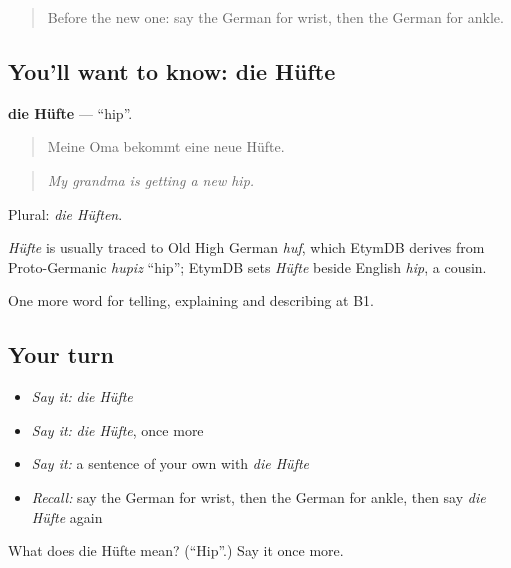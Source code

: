 \label{lesson:GE-C485-huefte}



\begin{quote}
Before the new one: say the German for wrist, then the German for ankle.
\end{quote}

\subsection*{You'll want to know: die Hüfte}
\textbf{die Hüfte} — \textquotedblleft{}hip\textquotedblright{}.

\begin{quote}
Meine Oma bekommt eine neue Hüfte.
\end{quote}

\begin{quote}
\emph{My grandma is getting a new hip.}
\end{quote}

Plural: \emph{die Hüften}.

\begin{cousinweb}
\emph{Hüfte} is usually traced to Old High German \emph{huf}, which EtymDB derives from Proto-Germanic \emph{hupiz} \textquotedblleft{}hip\textquotedblright{}; EtymDB sets \emph{Hüfte} beside English \emph{hip}, a cousin.
\end{cousinweb}

\begin{grammarlens}[title={What you've built}]
One more word for telling, explaining and describing at B1.
\end{grammarlens}

\subsection*{Your turn}
\begin{itemize}
\raggedright
  \item \emph{Say it:} \emph{die Hüfte}
  \item \emph{Say it:} \emph{die Hüfte}, once more
  \item \emph{Say it:} a sentence of your own with \emph{die Hüfte}
  \item \emph{Recall:} say the German for wrist, then the German for ankle, then say \emph{die Hüfte} again
\end{itemize}

\begin{tcolorbox}[breakable,colback=teal!4,colframe=teal!35!black,title={Before you move on}]
What does die Hüfte mean? (\textquotedblleft{}Hip\textquotedblright{}.) Say it once more.
\end{tcolorbox}
